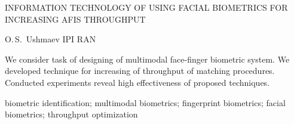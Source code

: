INFORMATION TECHNOLOGY OF USING FACIAL BIOMETRICS FOR
INCREASING AFIS THROUGHPUT

O.\,S.~Ushmaev
IPI RAN

We consider task of designing of multimodal face-finger biometric system. We developed
technique for increasing of throughput of matching procedures. Conducted experiments reveal high
effectiveness of proposed techniques.

biometric identification; multimodal biometrics; fingerprint biometrics;
facial  biometrics; throughput optimization
